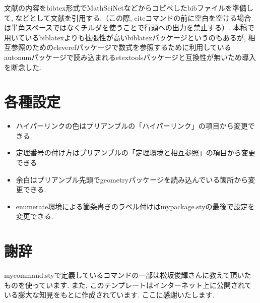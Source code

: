 \documentclass[11pt,a4paper,oneside,lualatex]{ltjsarticle} %
\numberwithin{equation}{section} %
\begin{document}
文献の内容をbibtex形式でMathSciNetなどからコピペしたbibファイルを準備して, \cite[定理 1.1]{AM}などとして文献を引用する.（この際, citeコマンドの前に空白を空ける場合は半角スペースではなくチルダを使うことで行頭への出力を禁止する）.
本稿で用いているbiblatexよりも拡張性が高いbiblatexパッケージというのもあるが, 相互参照のためのcleverefパッケージで数式を参照するために利用しているautonumパッケージで読み込まれるetextoolsパッケージと互換性が無いため導入を断念した. 


\section{各種設定} \label{sec:setting}


\begin{itemize}
	\item ハイパーリンクの色はプリアンブルの「ハイパーリンク」の項目から変更できる.
	\item 定理番号の付け方はプリアンブルの「定理環境と相互参照」の項目から変更できる.
	\item 余白はプリアンブル先頭でgeometryパッケージを読み込んでいる箇所から変更できる.
	\item enumerate環境による箇条書きのラベル付けはmypackage.styの最後で設定を変更できる. 
\end{itemize}



\section*{謝辞}


mycommand.styで定義しているコマンドの一部は松坂俊輝さんに教えて頂いたものを使っています.
また, このテンプレートはインターネット上に公開されている膨大な知見をもとに作成されています.
ここに感謝いたします.




\end{document}
